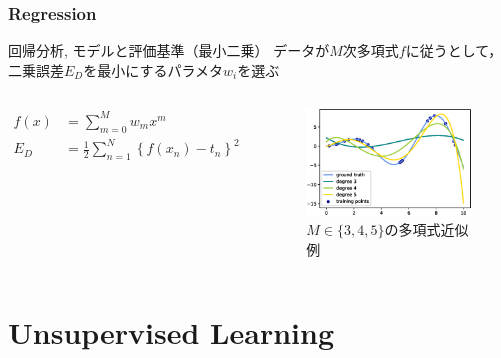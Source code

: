 \documentclass[dvipdfmx,platex]{beamer}
\begin{document}
\section{Regression}
\begin{frame}{{\mgfamily 回帰分析, モデルと評価基準（最小二乗）}}
  データが$M$次多項式$f$に従うとして，二乗誤差$E_D$を最小にするパラメタ$w_{\textit{i}}$を選ぶ
  \begin{columns}[T,onlytextwidth]
    \begin{align*}
      f(x)&=\sum_{m=0}^{M}w_mx^{m}\\
      E_{D}&=\frac{1}{2}\sum_{n=1}^{N}{\left\{f(x_n)-t_n\right\}}^2
    \end{align*}
    \begin{figure}
      \centering
      \includegraphics[width=5cm]{fig/polyreg.eps}
      \caption{$M\in\{3,4,5\}${\mgfamily の多項式近似例}}
    \end{figure}
  \end{columns}
\end{frame}
\part{Unsupervised Learning}
\end{document}
